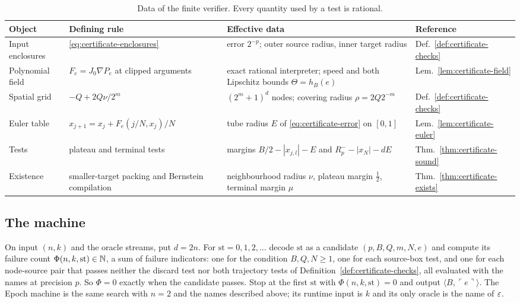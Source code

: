 \begin{table}[ht]
\centering\footnotesize
\begin{tabular}{@{}p{}p{}p{}p{}@{}}
\toprule
Object & Defining rule & Effective data & Reference\\
\midrule
Input enclosures & \eqref{eq:certificate-enclosures} & error $2^{-p}$; outer source radius, inner target radius & Def.~\ref{def:certificate-checks}\\
Polynomial field & $F_e=J_0\nabla P_e$ at clipped arguments & exact rational interpreter; speed and both Lipschitz bounds $\Theta=h_B(e)$ & Lem.~\ref{lem:certificate-field}\\
Spatial grid & $-Q+2Q\nu/2^m$ & $(2^m+1)^d$ nodes; covering radius $\rho=2Q2^{-m}$ & Def.~\ref{def:certificate-checks}\\
Euler table & $x_{j+1}=x_j+F_e(j/N,x_j)/N$ & tube radius $E$ of \eqref{eq:certificate-error} on $[0,1]$ & Lem.~\ref{lem:certificate-euler}\\
Tests & plateau and terminal tests & margins $B/2-|x_{j,l}|-E$ and $R^-_p-|x_N|-dE$ & Thm.~\ref{thm:certificate-sound}\\
Existence & smaller-target packing and Bernstein compilation & neighbourhood radius $\nu$, plateau margin $\frac12$, terminal margin $\mu$ & Thm.~\ref{thm:certificate-exists}\\
\bottomrule
\end{tabular}
\caption{Data of the finite verifier. Every quantity used by a test is rational.}
\label{tab:alg-deps}
\end{table}

\subsection{The machine}

\begin{construction}[Algorithm]\label{cons:alg-main}
On input $(n,k)$ and the oracle streams, put $d=2n$. For $\mathrm{st}=0,1,2,\dots$ decode $\mathrm{st}$ as a candidate
$(p,B,Q,m,N,e)$ and compute its failure count $\Phi(n,k,\mathrm{st})\in\mathbb{N}$, a sum of failure indicators: one for the condition
$B,Q,N\ge1$, one for each source-box test, and one for each node-source pair that passes neither the discard test nor
both trajectory tests of Definition~\ref{def:certificate-checks}, all evaluated with the names at precision $p$. So
$\Phi=0$ exactly when the candidate passes. Stop at the first $\mathrm{st}$ with $\Phi(n,k,\mathrm{st})=0$ and output $\langle B,\ulcorner e\urcorner\rangle$.
The Epoch machine is the same search with $n=2$ and the names described above; its runtime input is $k$ and its only
oracle is the name of $\varepsilon$.
\end{construction}

